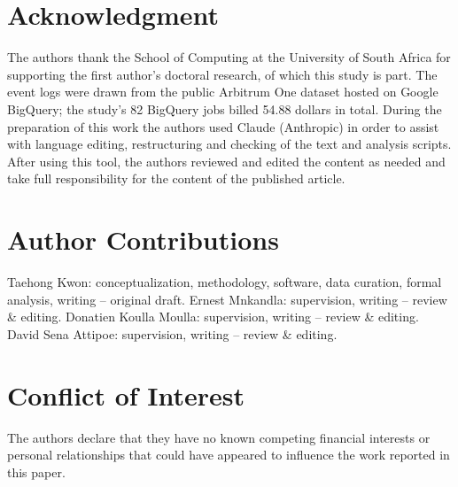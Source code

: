 \documentclass{ieeeaccess}
\begin{document}
\section*{Acknowledgment}
The authors thank the School of Computing at the University of South Africa for supporting the first author's doctoral research, of which this study is part. The event logs were drawn from the public Arbitrum One dataset hosted on Google BigQuery; the study's 82 BigQuery jobs billed 54.88 dollars in total. During the preparation of this work the authors used Claude (Anthropic) in order to assist with language editing, restructuring and checking of the text and analysis scripts. After using this tool, the authors reviewed and edited the content as needed and take full responsibility for the content of the published article.

\section*{Author Contributions}
Taehong Kwon: conceptualization, methodology, software, data curation, formal analysis, writing -- original draft. Ernest Mnkandla: supervision, writing -- review \& editing. Donatien Koulla Moulla: supervision, writing -- review \& editing. David Sena Attipoe: supervision, writing -- review \& editing.

\section*{Conflict of Interest}
The authors declare that they have no known competing financial interests or personal relationships that could have appeared to influence the work reported in this paper.
\end{document}
